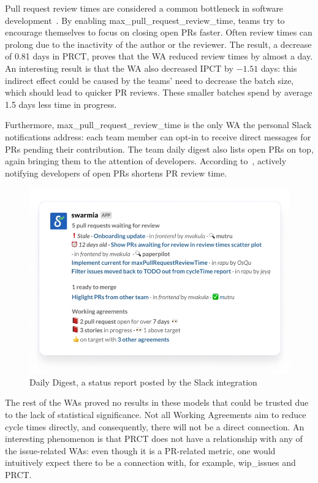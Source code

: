 Pull request review times are considered a common bottleneck in software development~\cite{maddila_nudge_2022}. By enabling max\_pull\_request\_review\_time, teams try to encourage themselves to focus on closing open PRs faster. Often review times can prolong due to the inactivity of the author or the reviewer. The result, a decrease of 0.81 days in PRCT, proves that the WA reduced review times by almost a day. An interesting result is that the WA also decreased IPCT by $-1.51$ days: this indirect effect could be caused by the teams' need to decrease the batch size, which should lead to quicker PR reviews. These smaller batches spend by average 1.5 days less time in progress.

Furthermore, max\_pull\_request\_review\_time is the only WA the personal Slack notifications address: each team member can opt-in to receive direct messages for PRs pending their contribution. The team daily digest also lists open PRs on top, again bringing them to the attention of developers. According to~\citet{maddila_nudge_2022}, actively notifying developers of open PRs shortens PR review time.

\begin{figure}[ht]
    \centering
    \includegraphics[width=13.5cm]{LaTeX/images/daily-digest.png}
    \caption{Daily Digest, a status report posted by the Slack integration}
    \label{fig:daily_digest}
\end{figure}

The rest of the WAs proved no results in these models that could be trusted due to the lack of statistical significance. Not all Working Agreements aim to reduce cycle times directly, and consequently, there will not be a direct connection. An interesting phenomenon is that PRCT does not have a relationship with any of the issue-related WAs: even though it is a PR-related metric, one would intuitively expect there to be a connection with, for example, wip\_issues and PRCT. 

